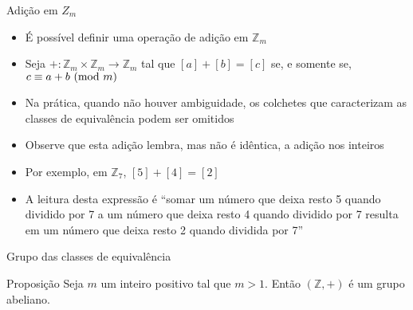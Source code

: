 \begin{frame}[fragile]{Adição em $Z_m$}

    \begin{itemize}
        \item É possível definir uma operação de adição em $\mathbb{Z}_m$

        \item Seja $+: \mathbb{Z}_m\times \mathbb{Z}_m \to \mathbb{Z}_m$ tal que
        $[a] + [b] = [c]$ se, e somente se, $c\equiv a + b\ (\mbox{mod}\ m)$

        \item Na prática, quando não houver ambiguidade, os colchetes que caracterizam as classes
            de equivalência podem ser omitidos

        \item Observe que esta adição lembra, mas não é idêntica, a adição nos inteiros

        \item Por exemplo, em $\mathbb{Z}_7$, $[5] + [4] = [2]$ 

        \item A leitura desta expressão é ``somar um número que deixa resto 5 quando dividido por
            7 a um número que deixa resto 4 quando dividido por 7 resulta em um número que deixa
            resto 2 quando dividida por 7''
    \end{itemize}

\end{frame}

\begin{frame}[fragile]{Grupo das classes de equivalência}

    \begin{block}{Proposição}
        Seja $m$ um inteiro positivo tal que $m > 1$. Então $(\mathbb{Z}, +)$ é um grupo
            abeliano.
    \end{block}

\end{frame}

